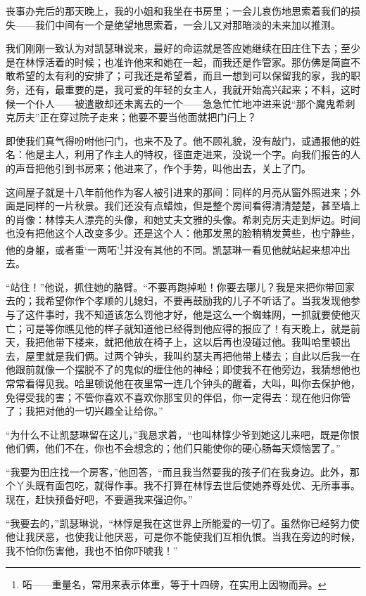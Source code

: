 \par 丧事办完后的那天晚上，我的小姐和我坐在书房里；一会儿哀伤地思索着我们的损失——我们中间有一个是绝望地思索着，一会儿又对那暗淡的未来加以推测。
\par 我们刚刚一致认为对凯瑟琳说来，最好的命运就是答应她继续在田庄住下去；至少是在林惇活着的时候；也准许他来和她在一起，而我还是作管家。那仿佛是简直不敢希望的太有利的安排了；可我还是希望着，而且一想到可以保留我的家，我的职务，还有，最重要的是，我可爱的年轻的女主人，我就开始高兴起来；不料，这时候一个仆人——被遣散却还未离去的一个——急急忙忙地冲进来说“那个魔鬼希刺克厉夫”正在穿过院子走来；他要不要当他面就把门闩上？
\par 即使我们真气得吩咐他闩门，也来不及了。他不顾礼貌，没有敲门，或通报他的姓名：他是主人，利用了作主人的特权，径直走进来，没说一个字。向我们报告的人的声音把他引到书房来；他进来了，作个手势，叫他出去，关上了门。
\par 这间屋子就是十八年前他作为客人被引进来的那间：同样的月亮从窗外照进来；外面是同样的一片秋景。我们还没有点蜡烛，但是整个房间看得清清楚楚，甚至墙上的肖像：林惇夫人漂亮的头像，和她丈夫文雅的头像。希刺克厉夫走到炉边。时间也没有把他这个人改变多少。还是这个人：他那发黑的脸稍稍发黄些，也宁静些，他的身躯，或者重‘一两𠰴’\footnote{𠰴——重量名，常用来表示体重，等于十四磅，在实用上因物而异。}并没有其他的不同。凯瑟琳一看见他就站起来想冲出去。
\par “站住！”他说，抓住她的胳臂。“不要再跑掉啦！你要去哪儿？我是来把你带回家去的；我希望你作个孝顺的儿媳妇，不要再鼓励我的儿子不听话了。当我发现他参与了这件事时，我不知道该怎么罚他才好，他是这么一个蜘蛛网，一抓就要使他灭亡；可是等你瞧见他的样子就知道他已经得到他应得的报应了！有天晚上，就是前天，我把他带下楼来，就把他放在椅子上，这以后再也没碰过他。我叫哈里顿出去，屋里就是我们俩。过两个钟头，我叫约瑟夫再把他带上楼去；自此以后我一在他跟前就像一个摆脱不了的鬼似的缠住他的神经；即使我不在他旁边，我猜想他也常常看得见我。哈里顿说他在夜里常一连几个钟头的醒着，大叫，叫你去保护他，免得受我的害；不管你喜欢不喜欢你那宝贝的伴侣，你一定得去：现在他归你管了；我把对他的一切兴趣全让给你。”
\par “为什么不让凯瑟琳留在这儿，”我恳求着，“也叫林惇少爷到她这儿来吧，既是你恨他们俩，他们不在，你也不会想念的；他们只能使你的硬心肠每天烦恼罢了。”
\par “我要为田庄找一个房客，”他回答，“而且我当然要我的孩子们在我身边。此外，那个丫头既有面包吃，就得作事。我不打算在林惇去世后使她养尊处优、无所事事。现在，赶快预备好吧，不要逼我来强迫你。”
\par “我要去的，”凯瑟琳说，“林惇是我在这世界上所能爱的一切了。虽然你已经努力使他让我厌恶，也使我让他厌恶，可是你不能使我们互相仇恨。当我在旁边的时候，我不怕你伤害他，我也不怕你吓唬我！”
